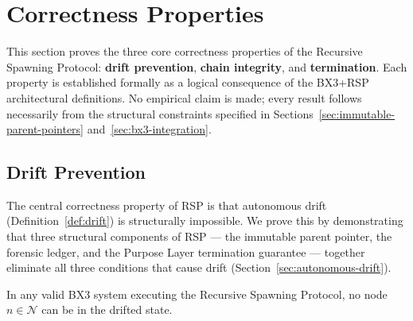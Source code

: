 \section{Correctness Properties}
\label{sec:correctness-properties}

This section proves the three core correctness properties of the Recursive Spawning Protocol: \textbf{drift prevention}, \textbf{chain integrity}, and \textbf{termination}. Each property is established formally as a logical consequence of the BX3+RSP architectural definitions. No empirical claim is made; every result follows necessarily from the structural constraints specified in Sections~\ref{sec:immutable-parent-pointers} and~\ref{sec:bx3-integration}.


\subsection{Drift Prevention}
\label{sec:drift-prevention}

The central correctness property of RSP is that autonomous drift (Definition~\ref{def:drift}) is structurally impossible. We prove this by demonstrating that three structural components of RSP — the immutable parent pointer, the forensic ledger, and the Purpose Layer termination guarantee — together eliminate all three conditions that cause drift (Section~\ref{sec:autonomous-drift}).

\begin{thrm}
\label{thrm:drift-prevention}
In any valid BX3 system executing the Recursive Spawning Protocol, no node $n \in \mathcal{N}$ can be in the drifted state.
\end{thrm}

